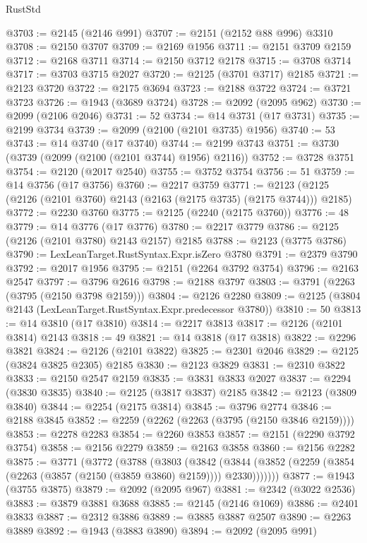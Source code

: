 \begin{lexlean}{RustStd}
\begin{coremodule}
@3703 := @2145 (@2146 @991)
@3707 := @2151 (@2152 @88 @996) @3310
@3708 := @2150 @3707
@3709 := @2169 @1956
@3711 := @2151 @3709 @2159
@3712 := @2168 @3711
@3714 := @2150 @3712 @2178
@3715 := @3708 @3714
@3717 := @3703 @3715 @2027
@3720 := @2125 (@3701 @3717) @2185
@3721 := @2123 @3720
@3722 := @2175 @3694
@3723 := @2188 @3722
@3724 := @3721 @3723
@3726 := @1943 (@3689 @3724)
@3728 := @2092 (@2095 @962)
@3730 := @2099 (@2106 @2046)
@3731 := 52
@3734 := @14 @3731 (@17 @3731)
@3735 := @2199 @3734
@3739 := @2099 (@2100 (@2101 @3735) @1956)
@3740 := 53
@3743 := @14 @3740 (@17 @3740)
@3744 := @2199 @3743
@3751 := @3730 (@3739 (@2099 (@2100 (@2101 @3744) @1956) @2116))
@3752 := @3728 @3751
@3754 := @2120 (@2017 @2540)
@3755 := @3752 @3754
@3756 := 51
@3759 := @14 @3756 (@17 @3756)
@3760 := @2217 @3759
@3771 := @2123 (@2125 (@2126 (@2101 @3760) @2143 (@2163 (@2175 @3735) (@2175 @3744))) @2185)
@3772 := @2230 @3760
@3775 := @2125 (@2240 (@2175 @3760))
@3776 := 48
@3779 := @14 @3776 (@17 @3776)
@3780 := @2217 @3779
@3786 := @2125 (@2126 (@2101 @3780) @2143 @2157) @2185
@3788 := @2123 (@3775 @3786)
@3790 := LexLeanTarget.RustSyntax.Expr.isZero @3780
@3791 := @2379 @3790
@3792 := @2017 @1956
@3795 := @2151 (@2264 @3792 @3754)
@3796 := @2163 @2547
@3797 := @3796 @2616
@3798 := @2188 @3797
@3803 := @3791 (@2263 (@3795 (@2150 @3798 @2159)))
@3804 := @2126 @2280
@3809 := @2125 (@3804 @2143 (LexLeanTarget.RustSyntax.Expr.predecessor @3780))
@3810 := 50
@3813 := @14 @3810 (@17 @3810)
@3814 := @2217 @3813
@3817 := @2126 (@2101 @3814) @2143
@3818 := 49
@3821 := @14 @3818 (@17 @3818)
@3822 := @2296 @3821
@3824 := @2126 (@2101 @3822)
@3825 := @2301 @2046
@3829 := @2125 (@3824 @3825 @2305) @2185
@3830 := @2123 @3829
@3831 := @2310 @3822
@3833 := @2150 @2547 @2159
@3835 := @3831 @3833 @2027
@3837 := @2294 (@3830 @3835)
@3840 := @2125 (@3817 @3837) @2185
@3842 := @2123 (@3809 @3840)
@3844 := @2254 (@2175 @3814)
@3845 := @3796 @2774
@3846 := @2188 @3845
@3852 := @2259 (@2262 (@2263 (@3795 (@2150 @3846 @2159))))
@3853 := @2278 @2283
@3854 := @2260 @3853
@3857 := @2151 (@2290 @3792 @3754)
@3858 := @2156 @2279
@3859 := @2163 @3858
@3860 := @2156 @2282
@3875 := @3771
    (@3772
      (@3788
        (@3803
          (@3842
            (@3844 (@3852 (@2259 (@3854 (@2263 (@3857 (@2150 (@3859 @3860) @2159)))) @2330)))))))
@3877 := @1943 (@3755 @3875)
@3879 := @2092 (@2095 @967)
@3881 := @2342 (@3022 @2536)
@3883 := @3879 @3881 @3688
@3885 := @2145 (@2146 @1069)
@3886 := @2401 @3833
@3887 := @2312 @3886
@3889 := @3885 @3887 @2507
@3890 := @2263 @3889
@3892 := @1943 (@3883 @3890)
@3894 := @2092 (@2095 @991)

\end{coremodule}
\end{lexlean}
